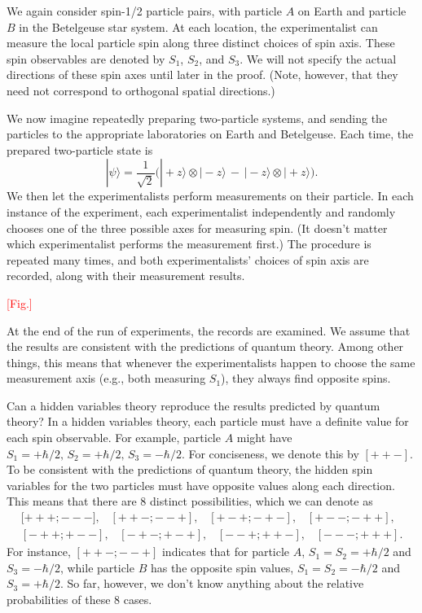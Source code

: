 \documentclass[pra,11pt]{revtex4}
\begin{document}
We again consider spin-1/2 particle pairs, with particle $A$ on Earth
and particle $B$ in the Betelgeuse star system.  At each location, the
experimentalist can measure the local particle spin along three
distinct choices of spin axis.  These spin observables are denoted by
$S_1$, $S_2$, and $S_3$.  We will not specify the actual directions of
these spin axes until later in the proof.  (Note, however, that they
need not correspond to orthogonal spatial directions.)

We now imagine repeatedly preparing two-particle systems, and sending
the particles to the appropriate laboratories on Earth and Betelgeuse.
Each time, the prepared two-particle state is
$$|\psi\rangle = \frac{1}{\sqrt{2}} \Big(|\!+\!z\rangle\otimes|\!-\!z\rangle \,-\, |\!-\!z\rangle\otimes|\!+\!z\rangle\Big).$$
We then let the experimentalists perform measurements on their
particle.  In each instance of the experiment, each experimentalist
independently and randomly chooses one of the three possible axes for
measuring spin.  (It doesn't matter which experimentalist performs the
measurement first.)  The procedure is repeated many times, and both
experimentalists' choices of spin axis are recorded, along with their
measurement results.

\textcolor{red}{[Fig.]}

At the end of the run of experiments, the records are examined.  We
assume that the results are consistent with the predictions of quantum
theory.  Among other things, this means that whenever the
experimentalists happen to choose the same measurement axis (e.g.,
both measuring $S_1$), they always find opposite spins.

Can a hidden variables theory reproduce the results predicted by
quantum theory?  In a hidden variables theory, each particle must have
a definite value for each spin observable.  For example, particle $A$
might have $S_1 = +\hbar/2, \, S_2 = +\hbar/2, \, S_3 = -\hbar/2$.
For conciseness, we denote this by $[++-]$.  To be consistent with the
predictions of quantum theory, the hidden spin variables for the two
particles must have opposite values along each direction.  This means
that there are $8$ distinct possibilities, which we can denote as
$$\begin{aligned}{[}{+++};{---}], \;\;\; [{++-};{--+}], \;\;\; [{+-+};{-+-}], \;\;\; [{+--};{-++}],\\ [{-++};{+--}], \;\;\; [{-+-};{+-+}], \;\;\; [{--+};{++-}], \;\;\; [{---};{+++}].\end{aligned}$$
For instance, $[{++-};{--+}]$ indicates that for particle $A$, $S_1 =
S_2 = +\hbar/2$ and $S_3 = -\hbar/2$, while particle $B$ has the
opposite spin values, $S_1 = S_2 = -\hbar/2$ and $S_3 = +\hbar/2$.
So far, however, we don't know anything about the relative
probabilities of these 8 cases.
\end{document}
